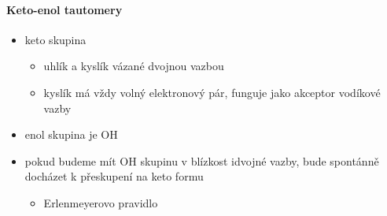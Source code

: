 \documentclass[DIV=8]{scrreprt}
\begin{document}
\paragraph{Keto-enol tautomery}
\begin{itemize}[nosep]
    \item keto skupina
\begin{itemize}[nosep]
    \item uhlík a kyslík vázané dvojnou vazbou
    \item kyslík má vždy volný elektronový pár, funguje jako akceptor vodíkové vazby
\end{itemize}

    \item enol skupina je OH
    \item pokud budeme mít OH skupinu v blízkost idvojné vazby, bude spontánně docházet k přeskupení na keto formu
\begin{itemize}[nosep]
    \item Erlenmeyerovo pravidlo
\end{itemize}

\end{itemize}
\end{document}
